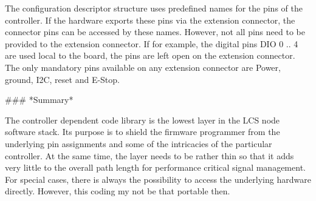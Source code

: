 The configuration descriptor structure uses predefined names for the pins of the controller. If the hardware exports these pins via the extension connector, the connector pins can be accessed by these names. However, not all pins need to be provided to the extension connector. If for example, the digital pins DIO 0 .. 4 are used local to the board, the pins are left open on the extension connector. The only mandatory pins available on any extension connector are Power, ground, I2C, reset and E-Stop.

### *Summary*

The controller dependent code library is the lowest layer in the LCS node software stack. Its purpose is to shield the firmware programmer from the underlying pin assignments and some of the intricacies of the particular controller. At the same time, the layer needs to be rather thin so that it adds very little to the overall path length for performance critical signal management. For special cases, there is always the possibility to access the underlying hardware directly. However, this coding my not be that portable then.

